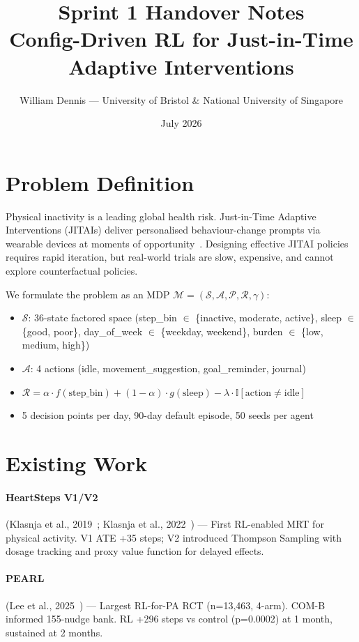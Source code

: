 \documentclass[10pt,a4paper]{article}
\title{\vspace{-1cm}Sprint 1 Handover Notes\\{\large Config-Driven RL for Just-in-Time Adaptive Interventions}}
\author{William Dennis --- University of Bristol \& National University of Singapore}
\date{July 2026}
\begin{document}
\maketitle
\thispagestyle{empty}

\section{Problem Definition}

Physical inactivity is a leading global health risk. Just-in-Time Adaptive Interventions (JITAIs) deliver personalised behaviour-change prompts via wearable devices at moments of opportunity~\cite{klasnja2019heartsteps}. Designing effective JITAI policies requires rapid iteration, but real-world trials are slow, expensive, and cannot explore counterfactual policies.

We formulate the problem as an MDP \(\mathcal{M} = (\mathcal{S}, \mathcal{A}, \mathcal{P}, \mathcal{R}, \gamma)\):
\begin{itemize}
  \item \(\mathcal{S}\): 36-state factored space (step\_bin \(\in\) \{inactive, moderate, active\}, sleep \(\in\) \{good, poor\}, day\_of\_week \(\in\) \{weekday, weekend\}, burden \(\in\) \{low, medium, high\})
  \item \(\mathcal{A}\): 4 actions (idle, movement\_suggestion, goal\_reminder, journal)
  \item \(\mathcal{R} = \alpha \cdot f(\text{step\_bin}) + (1 - \alpha) \cdot g(\text{sleep}) - \lambda \cdot \mathbb{I}[\text{action} \neq \text{idle}]\)
  \item 5 decision points per day, 90-day default episode, 50 seeds per agent
\end{itemize}

\section{Existing Work}
\vspace{-2pt}
\paragraph{HeartSteps V1/V2} (Klasnja et al., 2019~\cite{klasnja2019heartsteps}; Klasnja et al., 2022~\cite{klasnja2022heartsteps}) --- First RL-enabled MRT for physical activity. V1 ATE +35 steps; V2 introduced Thompson Sampling with dosage tracking and proxy value function for delayed effects.

\paragraph{PEARL} (Lee et al., 2025~\cite{lee2025pearl}) --- Largest RL-for-PA RCT (n=13,463, 4-arm). COM-B informed 155-nudge bank. RL +296 steps vs control (p=0.0002) at 1 month, sustained at 2 months.
\end{document}
